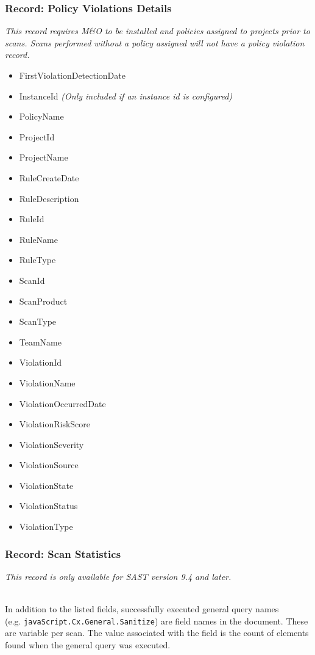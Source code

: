 \subsubsection{Record: Policy Violations Details}
\textit{This record requires M\&O to be installed and policies assigned to projects prior to scans.  Scans performed without a policy assigned will not have a policy
violation record.}

\begin{itemize}
    \item FirstViolationDetectionDate
    \item InstanceId \textit{(Only included if an instance id is configured)}
    \item PolicyName
    \item ProjectId
    \item ProjectName
    \item RuleCreateDate
    \item RuleDescription
    \item RuleId
    \item RuleName
    \item RuleType
    \item ScanId
    \item ScanProduct
    \item ScanType
    \item TeamName
    \item ViolationId
    \item ViolationName
    \item ViolationOccurredDate
    \item ViolationRiskScore
    \item ViolationSeverity
    \item ViolationSource
    \item ViolationState
    \item ViolationStatus
    \item ViolationType
\end{itemize}


\subsubsection{Record: Scan Statistics}
\textit{This record is only available for SAST version 9.4 and later.}

\noindent\\In addition to the listed fields, successfully executed general query names \\
(e.g. \texttt{javaScript.Cx.General.Sanitize}) are field names in the 
document.  These are variable per scan.  The value associated with the field is the count of elements found when the general query was executed.

